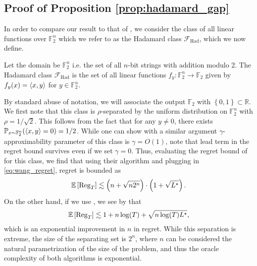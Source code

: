 

\subsection{Proof of Proposition \ref{prop:hadamard_gap}}
\label{sec:hadamard_gap}

In order to compare our result to that of \citet{wang2022adaptive}, we consider the class of all linear functions over $\mathbb{F}_2^n$ which we refer to as the Hadamard class $\mathcal{F}_{\mathrm{Had}}$, which we now define. 

\begin{definition}
    Let the domain be $ \mathbb{F}_2^n $ i.e. the set of all $n$-bit strings with addition modulo 2.
    The Hadamard class $\mathcal{F}_{\mathrm{Had}}$ is the set of all linear functions $f_y: \mathbb{F}_2^n \to \mathbb{F}_2 $ given by $f_y(x) = \left\langle x, y \right\rangle$ for $y \in \mathbb{F}_2^n$.
\end{definition}

By standard abuse of notation, we will associate the output $ \mathbb{F}_2 $ with $ \left\{ 0,1 \right\} \subset \mathbb{R} $.   
We first note that this class is $\rho$-separated by the uniform distribution on $\mathbb{F}_2^n$ with $\rho = 1/\sqrt{2}$. 
This follows from the fact that for any $y \neq 0 $, there exists $\mathbb{P}_{x \sim \mathbb{F}_2^n } ( \left\langle x, y \right\rangle = 0 ) = 1/2  $.
While one can show with a similar argument $\gamma$-approximability parameter of this class is $ \gamma = O(1) $, note that lead term in the regret bound  survives even if we set $\gamma = 0$.
Thus, evaluating the regret bound of \citet{wang2022adaptive} for this class, we find that using their algorithm and plugging in \eqref{eq:wang_regret}, regret is bounded as
\begin{align}
    \mathbb{E}\left[ \operatorname{Reg}_T \right]\lesssim \left( n + \sqrt{n 2^n}\right) \cdot \left(1 + \sqrt{L^\star} \right).
\end{align}  
On the other hand, if we use , we see by  that
\begin{align}\label{eq:hadamard_guassian}
    \mathbb{E}\left[ \operatorname{Reg}_T \right] \lesssim 1 + n \log(T) +  \sqrt{n \log(T) L^\star},
\end{align}
which is an exponential improvement in $n$ in regret.  While this separation is extreme, the size of the separating set is $2^n$,  where $n$ can be considered the natural parametrization of the size of the problem, and thus the oracle complexity of both algorithms is exponential. 

